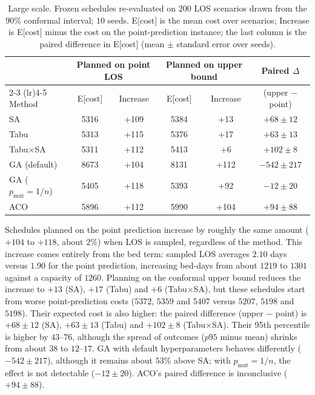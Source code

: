 \documentclass[11pt,a4paper]{article}
\begin{document}
\begin{table}[H]
\centering
\caption{Large scale. Frozen schedules re-evaluated on \(200\) LOS scenarios drawn from the 90\% conformal interval; \(10\) seeds. E[cost] is the mean cost over scenarios; Increase is E[cost] minus the cost on the point-prediction instance; the last column is the paired difference in E[cost] (mean \(\pm\) standard error over seeds).}
\label{tab:robust}
\small
\setlength{\tabcolsep}{4pt}
\begin{tabular}{lccccc}
\toprule
 & \multicolumn{2}{c}{Planned on point LOS} & \multicolumn{2}{c}{Planned on upper bound} & {Paired \(\Delta\)} \\
\cmidrule(lr){2-3} \cmidrule(lr){4-5}
{Method} & {E[cost]} & {Increase} & {E[cost]} & {Increase} & {(upper \(-\) point)} \\
\midrule
SA                          & 5316 & +109 & 5384 & +13  & \(+68 \pm 12\) \\
Tabu                        & 5313 & +115 & 5376 & +17  & \(+63 \pm 13\) \\
Tabu\(\times\)SA            & 5311 & +112 & 5413 & +6   & \(+102 \pm 8\) \\
GA (default)                & 8673 & +104 & 8131 & +112 & \(-542 \pm 217\) \\
GA (\(p_{\mathrm{mut}}=1/n\)) & 5405 & +118 & 5393 & +92  & \(-12 \pm 20\) \\
ACO                         & 5896 & +112 & 5990 & +104 & \(+94 \pm 88\) \\
\bottomrule
\end{tabular}
\normalsize
\end{table}

Schedules planned on the point prediction increase by roughly the same amount (\(+104\) to \(+118\), about \(2\%\)) when LOS is sampled, regardless of the method. This increase comes entirely from the bed term: sampled LOS averages \(2.10\) days versus \(1.90\) for the point prediction, increasing bed-days from about \(1219\) to \(1301\) against a capacity of \(1260\). Planning on the conformal upper bound reduces the increase to \(+13\) (SA), \(+17\) (Tabu) and \(+6\) (Tabu\(\times\)SA), but these schedules start from worse point-prediction costs (\(5372\), \(5359\) and \(5407\) versus \(5207\), \(5198\) and \(5198\)). Their expected cost is also higher: the paired difference (upper \(-\) point) is \(+68 \pm 12\) (SA), \(+63 \pm 13\) (Tabu) and \(+102 \pm 8\) (Tabu\(\times\)SA). Their 95th percentile is higher by \(43\)--\(76\), although the spread of outcomes (\(p95\) minus mean) shrinks from about \(38\) to \(12\)--\(17\). GA with default hyperparameters behaves differently (\(-542 \pm 217\)), although it remains about \(53\%\) above SA; with \(p_{\mathrm{mut}}=1/n\), the effect is not detectable (\(-12 \pm 20\)). ACO's paired difference is inconclusive (\(+94 \pm 88\)).
\end{document}
